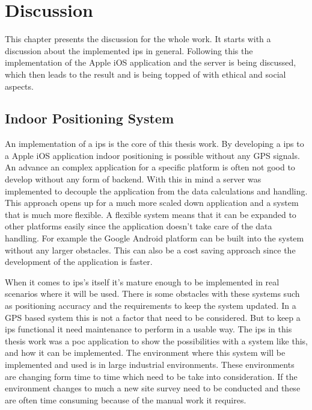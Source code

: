 \chapter{Discussion} \label{sec:discussion}
This chapter presents the discussion for the whole work.
It starts with a discussion about the implemented \acrfull{ips} in general.
Following this the implementation of the Apple iOS application and the server is being discussed, which then leads to the result and is being topped of with ethical and social aspects.

\section{Indoor Positioning System}\label{sec:discussionIps}
An implementation of a \acrshort{ips} is the core of this thesis work.
By developing a \acrshort{ips} to a Apple iOS application indoor positioning is possible without any GPS signals.
An advance an complex application for a specific platform is often not good to develop without any form of backend.
With this in mind a server was implemented to decouple the application from the data calculations and handling.
This approach opens up for a much more scaled down application and a system that is much more flexible.
A flexible system means that it can be expanded to other platforms easily since the application doesn't take care of the data handling.
For example the Google Android platform can be built into the system without any larger obstacles.
This can also be a cost saving approach since the development of the application is faster.

\bigskip

When it comes to \acrshort{ips}'s itself it's mature enough to be implemented in real scenarios where it will be used.
There is some obstacles with these systems such as positioning accuracy and the requirements to keep the system updated. 
In a GPS based system this is not a factor that need to be considered.
But to keep a \acrshort{ips} functional it need maintenance to perform in a usable way.
The \acrshort{ips} in this thesis work was a \acrfull{poc} application to show the possibilities with a system like this, and how it can be implemented.
The environment where this system will be implemented and used is in large industrial environments.
These environments are changing form time to time which need to be take into consideration.
If the environment changes to much a new site survey need to be conducted and these are often time consuming because of the manual work it requires.


